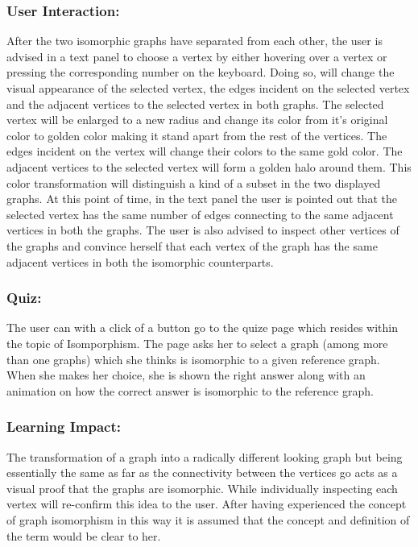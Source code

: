 \subsubsection{User Interaction:}
After the two isomorphic graphs have separated from each other, the user is
advised in a text panel to choose a vertex by either hovering over a vertex or
pressing the corresponding number on the keyboard. Doing so, will change the
visual appearance of the selected vertex, the edges incident on the selected
vertex and the adjacent vertices to the selected vertex in both graphs.  The
selected vertex will be enlarged to a new radius and change its color from it's
original color to golden color making it stand apart from the rest of the
vertices.  The edges incident on the vertex will change their colors to the
same gold color.  The adjacent vertices to the selected vertex will form a
golden halo around them.  This color transformation will distinguish a kind of
a subset in the two displayed graphs. At this point of time, in the text panel
the user is pointed out that the selected vertex has the same number of edges
connecting to the same adjacent vertices in both the graphs.  The user is also
advised to inspect other vertices of the graphs and convince herself that each
vertex of the graph has the same adjacent vertices in both the isomorphic
counterparts.

\subsubsection{Quiz:}
The user can with a click of a button go to the quize page which resides within
the topic of Isomporphism. The page asks her to select a graph (among more than
one graphs) which she thinks is isomorphic to a given reference graph.  When
she makes her choice, she is shown the right answer along with an animation on
how the correct answer is isomorphic to the reference graph.

\subsubsection{Learning Impact:}
The transformation of a graph into a radically different looking graph but
being essentially the same as far as the connectivity between the vertices go
acts as a visual proof that the graphs are isomorphic.  While individually
inspecting each vertex will re-confirm this idea to the user. After having
experienced the concept of graph isomorphism in this way it is assumed that the
concept and definition of the term would be clear to her.


